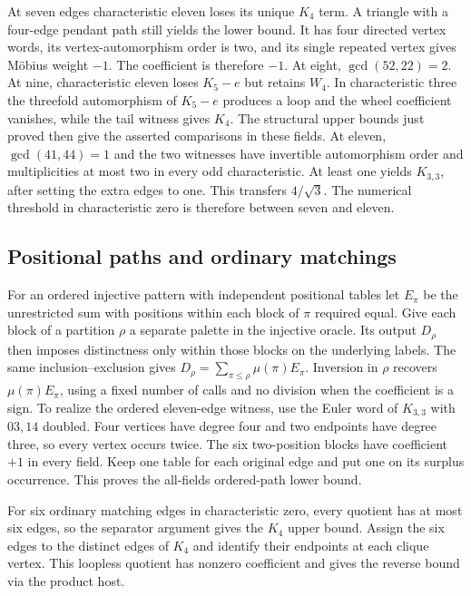 \documentclass[11pt,letterpaper]{article}
\begin{document}
At seven edges characteristic eleven loses its unique \(K_4\) term. A triangle with a four-edge pendant path still yields the lower bound. It has four directed vertex words, its vertex-automorphism order is two, and its single repeated vertex gives Möbius weight \(-1\). The coefficient is therefore \(-1\). At eight, \(\gcd(52,22)=2\). At nine, characteristic eleven loses \(K_5-e\) but retains \(W_4\). In characteristic three the threefold automorphism of \(K_5-e\) produces a loop and the wheel coefficient vanishes, while the tail witness gives \(K_4\). The structural upper bounds just proved then give the asserted comparisons in these fields. At eleven, \(\gcd(41,44)=1\) and the two witnesses have invertible automorphism order and multiplicities at most two in every odd characteristic. At least one yields \(K_{3,3}\), after setting the extra edges to one. This transfers \(4/\sqrt3\). The numerical threshold in characteristic zero is therefore between seven and eleven.

\subsection{Positional paths and ordinary matchings}\label{positional-paths-and-ordinary-matchings}

For an ordered injective pattern with independent positional tables let \(E_\pi\) be the unrestricted sum with positions within each block of \(\pi\) required equal. Give each block of a partition \(\rho\) a separate palette in the injective oracle. Its output \(D_\rho\) then imposes distinctness only within those blocks on the underlying labels. The same inclusion--exclusion gives \(D_\rho=\sum_{\pi\le\rho}\mu(\pi)E_\pi\). Inversion in \(\rho\) recovers \(\mu(\pi)E_\pi\), using a fixed number of calls and no division when the coefficient is a sign. To realize the ordered eleven-edge witness, use the Euler word of \(K_{3,3}\) with \(03,14\) doubled. Four vertices have degree four and two endpoints have degree three, so every vertex occurs twice. The six two-position blocks have coefficient \(+1\) in every field. Keep one table for each original edge and put one on its surplus occurrence. This proves the all-fields ordered-path lower bound.

For six ordinary matching edges in characteristic zero, every quotient has at most six edges, so the separator argument gives the \(K_4\) upper bound. Assign the six edges to the distinct edges of \(K_4\) and identify their endpoints at each clique vertex. This loopless quotient has nonzero coefficient and gives the reverse bound via the product host.
\end{document}

